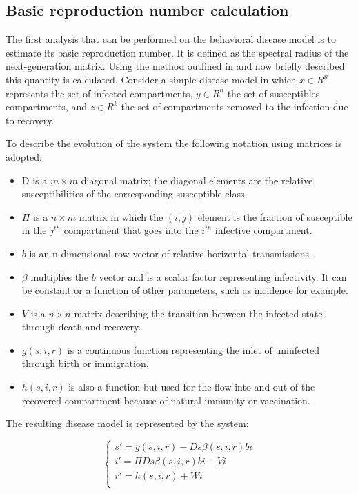 \subsection{Basic reproduction number calculation}
The first analysis that can be performed on the behavioral disease model is to estimate its basic reproduction number. It is defined as the spectral radius of the next-generation matrix. Using the method outlined in \cite{arino2007} and now briefly described this quantity is calculated. 
Consider a simple disease model in which $x \in R^n$ represents the set of infected compartments, $y \in R^n$ the set of susceptibles compartments, and $z \in R^k$ the set of compartments removed to the infection due to recovery. 

To describe the evolution of the system the following notation using matrices is adopted: 
\begin{itemize}
	\item D is a $m \times m$ diagonal matrix; the diagonal elements are the relative susceptibilities of the corresponding susceptible class.
	\item $\Pi$ is a $n \times m$ matrix in which the $(i,j)$ element is the fraction of susceptible in the $j^{th}$ compartment that goes into the $i^{th}$ infective compartment.
	\item $b$ is an n-dimensional row vector of relative
	horizontal transmissions.
	\item $\beta$ multiplies the $b$ vector and is a scalar factor representing infectivity. It can be constant or a function of other parameters, such as incidence for example. 
	
	\item $V$ is a $n \times n$ matrix describing the transition between the infected state through death and recovery. 
	\item $g(s, i,r)$ is a continuous function representing the inlet of uninfected through birth or immigration. 
	\item $h(s, i, r)$ is also a function but used for the flow into and out of the recovered compartment because of natural immunity or vaccination.
\end{itemize} 

The resulting disease model is represented by the system:

\begin{equation}
	\begin{cases}
		s' = g(s,i,r) - D s \beta(s,i,r) b i\\
		i' = \Pi D s \beta(s,i,r) b i - V i\\
		r' = h(s,i,r) + W i \\		
	\end{cases}
	\label{eq:epi_ro_eq}
\end{equation}

